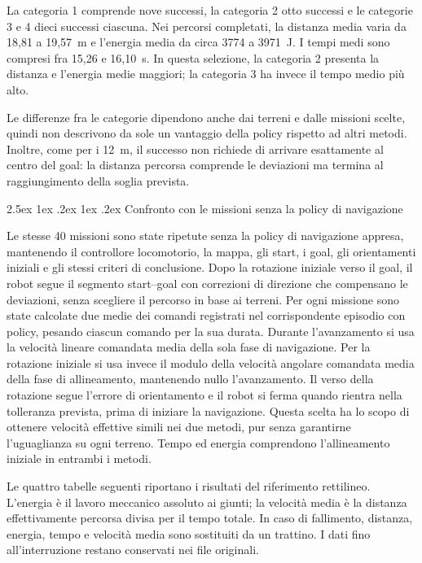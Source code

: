 \documentclass[11pt,a4paper]{article}
\makeatletter
\newcommand{\subsubsubsection}{%
  \@startsection{paragraph}{4}{\z@}%
  {2.5ex \@plus 1ex \@minus .2ex}%
  {1ex \@plus .2ex}%
  {\normalfont\normalsize\bfseries}}
\makeatother
\begin{document}


La categoria 1 comprende nove successi, la categoria 2 otto successi e le categorie 3 e 4 dieci successi ciascuna. Nei percorsi completati, la distanza media varia da 18,81 a 19,57~m e l'energia media da circa 3774 a 3971~J. I tempi medi sono compresi fra 15,26 e 16,10~s. In questa selezione, la categoria 2 presenta la distanza e l'energia medie maggiori; la categoria 3 ha invece il tempo medio più alto.

Le differenze fra le categorie dipendono anche dai terreni e dalle missioni scelte, quindi non descrivono da sole un vantaggio della policy rispetto ad altri metodi. Inoltre, come per i 12~m, il successo non richiede di arrivare esattamente al centro del goal: la distanza percorsa comprende le deviazioni ma termina al raggiungimento della soglia prevista.

\subsubsubsection{Confronto con le missioni senza la policy di navigazione}

Le stesse 40 missioni sono state ripetute senza la policy di navigazione appresa, mantenendo il controllore locomotorio, la mappa, gli start, i goal, gli orientamenti iniziali e gli stessi criteri di conclusione. Dopo la rotazione iniziale verso il goal, il robot segue il segmento start--goal con correzioni di direzione che compensano le deviazioni, senza scegliere il percorso in base ai terreni. Per ogni missione sono state calcolate due medie dei comandi registrati nel corrispondente episodio con policy, pesando ciascun comando per la sua durata. Durante l'avanzamento si usa la velocità lineare comandata media della sola fase di navigazione. Per la rotazione iniziale si usa invece il modulo della velocità angolare comandata media della fase di allineamento, mantenendo nullo l'avanzamento. Il verso della rotazione segue l'errore di orientamento e il robot si ferma quando rientra nella tolleranza prevista, prima di iniziare la navigazione. Questa scelta ha lo scopo di ottenere velocità effettive simili nei due metodi, pur senza garantirne l'uguaglianza su ogni terreno. Tempo ed energia comprendono l'allineamento iniziale in entrambi i metodi.

Le quattro tabelle seguenti riportano i risultati del riferimento rettilineo. L'energia è il lavoro meccanico assoluto ai giunti; la velocità media è la distanza effettivamente percorsa divisa per il tempo totale. In caso di fallimento, distanza, energia, tempo e velocità media sono sostituiti da un trattino. I dati fino all'interruzione restano conservati nei file originali.
\end{document}
